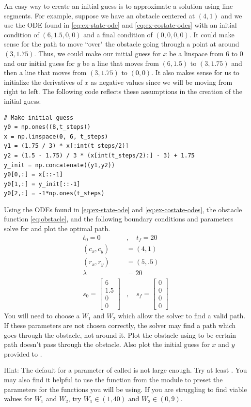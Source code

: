 An easy way to create an initial guess is to approximate a solution using line segments. 
For example, suppose we have an obstacle centered at $(4,1)$ and we use the ODE found in \ref{eq:ex-state-ode} and \ref{eq:ex-costate-odes} with an initial condition of $(6, 1.5, 0, 0)$ and a final condition of $(0,0,0, 0)$. 
It could make sense for the path to move ``over" the obstacle going through a point at around $(3, 1.75)$. 
Thus, we could make our initial guess for $x$ be a linspace from 6 to 0 and our initial guess for $y$ be a line that moves from $(6,1.5)$ to $(3, 1.75)$ and then a line that moves from $(3, 1.75)$ to $(0,0)$. 
It also makes sense for us to initialize the derivatives of $x$ as negative values since we will be moving from right to left. 
The following code reflects these assumptions in the creation of the initial guess:

\begin{lstlisting}
# Make initial guess
y0 = np.ones((8,t_steps))
x = np.linspace(0, 6, t_steps)
y1 = (1.75 / 3) * x[:int(t_steps/2)]
y2 = (1.5 - 1.75) / 3 * (x[int(t_steps/2):] - 3) + 1.75
y_init = np.concatenate((y1,y2))
y0[0,:] = x[::-1]
y0[1,:] = y_init[::-1]
y0[2,:] = -1*np.ones(t_steps)
\end{lstlisting}


\begin{problem}
\label{prob:obstacle:bvp2}
Using the ODEs found in \ref{eq:ex-state-ode} and \ref{eq:ex-costate-odes}, the obstacle function \ref{eq:obstacle}, and the following boundary conditions and parameters solve for and plot the optimal path.
\begin{align*}
    t_0 = 0 &, \quad t_f = 20\\
    (c_x,c_y) &= (4,1)\\
    (r_x,r_y) &= (5,.5)\\
    \lambda &= 20\\
    s_0 = \begin{bmatrix}6\\1.5\\0\\0 \end{bmatrix}&, \quad s_f = \begin{bmatrix}0\\0\\0\\0 \end{bmatrix}
\end{align*}
You will need to choose a $W_1$ and $W_2$ which allow the solver to find a valid path.
If these parameters are not chosen correctly, the solver may find a path which goes through the obstacle, not around it.
Plot the obstacle using  to be certain path doesn't pass through the obstacle. Also plot the initial guess for $x$ and $y$ provided to .

Hint: The default for a parameter of  called  is not large enough.
Try at least .
You may also find it helpful to use the function  from the module  to preset the parameters for the functions you will be using.
If you are struggling to find viable values for $W_1$ and $W_2$, try $W_1\in (1,40)$ and $W_2\in (0,9)$. 
\end{problem}

